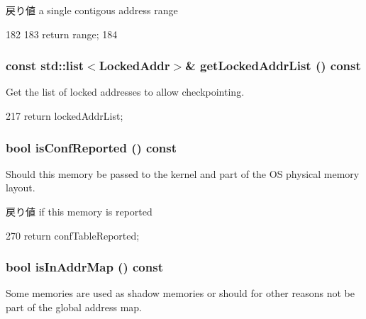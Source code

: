 \begin{DoxyReturn}{戻り値}
a single contigous address range 
\end{DoxyReturn}



\begin{DoxyCode}
182 {
183     return range;
184 }
\end{DoxyCode}
\hypertarget{classAbstractMemory_a5b569455e6a1bd8629737fa02564a9a8}{
\subsubsection[{getLockedAddrList}]{\setlength{\rightskip}{0pt plus 5cm}const {\bf std::list}$<${\bf LockedAddr}$>$\& getLockedAddrList () const}}
\label{classAbstractMemory_a5b569455e6a1bd8629737fa02564a9a8}
Get the list of locked addresses to allow checkpointing. 


\begin{DoxyCode}
217     { return lockedAddrList; }
\end{DoxyCode}
\hypertarget{classAbstractMemory_aca224861e09cf94a49088bb51bb02350}{
\subsubsection[{isConfReported}]{\setlength{\rightskip}{0pt plus 5cm}bool isConfReported () const}}
\label{classAbstractMemory_aca224861e09cf94a49088bb51bb02350}
Should this memory be passed to the kernel and part of the OS physical memory layout.

\begin{DoxyReturn}{戻り値}
if this memory is reported 
\end{DoxyReturn}



\begin{DoxyCode}
270 { return confTableReported; }
\end{DoxyCode}
\hypertarget{classAbstractMemory_ad89e9980a76342142d63ff15deb19497}{
\subsubsection[{isInAddrMap}]{\setlength{\rightskip}{0pt plus 5cm}bool isInAddrMap () const}}
\label{classAbstractMemory_ad89e9980a76342142d63ff15deb19497}
Some memories are used as shadow memories or should for other reasons not be part of the global address map.

